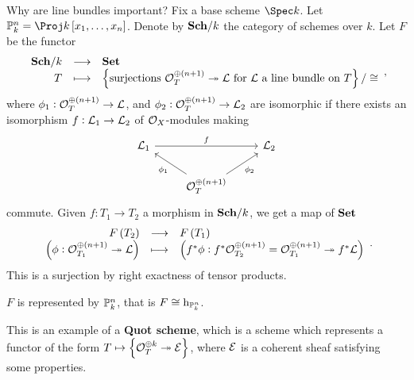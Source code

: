 Why are line bundles important? Fix a base scheme $ \Spec k $. Let $ \PP_k^n = \Proj k\sbr{x_1, \dots, x_n} $. Denote by $ \textbf{Sch} / k $ the category of schemes over $ k $. Let $ F $ be the functor
$$ \function{\Sch / k}{\Set}{T}{\cbr{\text{surjections} \ \OOO_T^{\oplus \br{n + 1}} \twoheadrightarrow \LLL \ \text{for} \ \LLL \ \text{a line bundle on} \ T} / \cong}, $$
where $ \phi_1 : \OOO_T^{\oplus \br{n + 1}} \to \LLL $, and $ \phi_2 : \OOO_T^{\oplus \br{n + 1}} \to \LLL_2 $ are isomorphic if there exists an isomorphism $ f : \mathcal{L}_1 \to \mathcal{L}_2 $ of $ \mathcal{O}_X $-modules making
$$
\begin{tikzcd}
\LLL_1 \arrow{rr}{f} & & \LLL_2 \\
& \OOO_T^{\oplus \br{n + 1}} \arrow{ul}{\phi_1} \arrow{ur}[swap]{\phi_2} &
\end{tikzcd}
$$
commute. Given $ f : T_1 \to T_2 $ a morphism in $ \textbf{Sch} / k $, we get a map of $ \textbf{Set} $
$$ \function{F\br{T_2}}{F\br{T_1}}{\br{\phi : \OOO_{T_1}^{\oplus \br{n + 1}} \twoheadrightarrow \LLL}}{\br{f^*\phi : f^*\OOO_{T_2}^{\oplus \br{n + 1}} = \OOO_{T_1}^{\oplus \br{n + 1}} \twoheadrightarrow f^*\LLL}}. $$
This is a surjection by right exactness of tensor products.

\pagebreak

\begin{theorem}
$ F $ is represented by $ \mathbb{P}_k^n $, that is $ F \cong \mathrm{h}_{\mathbb{P}_k^n} $.
\end{theorem}

\begin{remark*}
This is an example of a \textbf{Quot scheme}, which is a scheme which represents a functor of the form $ T \mapsto \cbr{\OOO_T^{\oplus k} \twoheadrightarrow \EEE} $, where $ \mathcal{E} $ is a coherent sheaf satisfying some properties.
\end{remark*}


